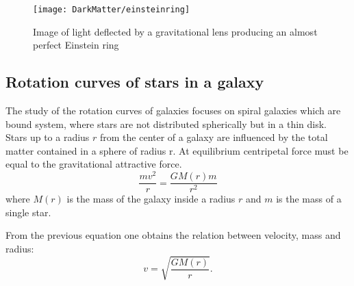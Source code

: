 \begin{figure}[pt]
\centering
\texttt{[image: DarkMatter/einsteinring]}
\caption{Image of light deflected by a gravitational lens producing an almost perfect Einstein ring}
\label{fig:einsteinring}
\end{figure}



   
\subsection{Rotation curves of stars in a galaxy}
\label{sec:rotcurves}
The study of the rotation curves of galaxies focuses on spiral galaxies which are bound system, where stars are not distributed spherically but in a thin disk. Stars up to a radius $r$ from the center of a galaxy are influenced by the total matter contained in a sphere of radius r. At equilibrium centripetal force must be equal to the gravitational attractive force.
\begin{equation}
\frac{mv^2}{r}=\frac{GM(r)m}{r^2}
\label{previous}
\end{equation}
where $M(r)$ is the mass of the galaxy inside a radius $r$ and $m$ is the mass of a single star. 

From the previous equation one obtains the relation between velocity, mass and radius:
\begin{equation}
v=\sqrt{\frac{GM(r)}{r}}.
\end{equation}

